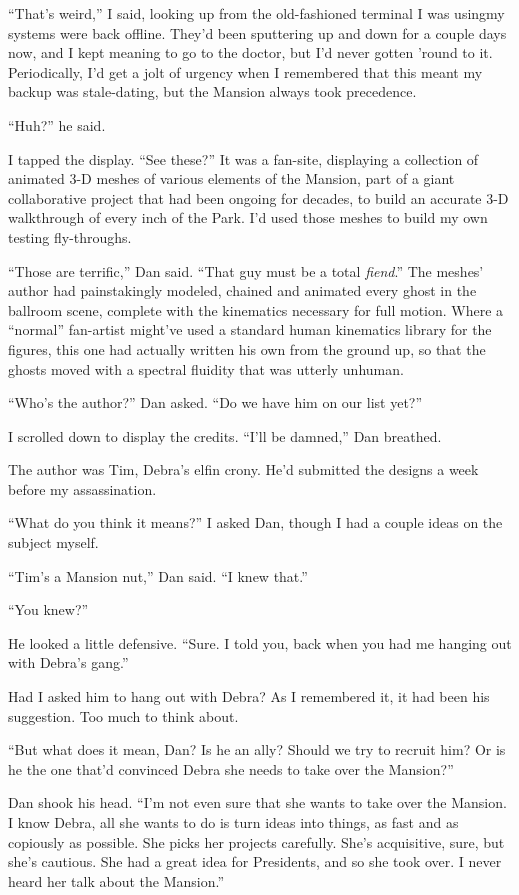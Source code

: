 “That's weird,” I said, looking up from the old-fashioned terminal
I was using{\dash}my systems were back offline. They'd been sputtering up
and down for a couple days now, and I kept meaning to go to the
doctor, but I'd never gotten 'round to it. Periodically, I'd get a
jolt of urgency when I remembered that this meant my backup was
stale-dating, but the Mansion always took precedence.

“Huh?” he said.

I tapped the display. “See these?” It was a fan-site, displaying a
collection of animated 3-D meshes of various elements of the
Mansion, part of a giant collaborative project that had been
ongoing for decades, to build an accurate 3-D walkthrough of every
inch of the Park. I'd used those meshes to build my own testing
fly-throughs.

“Those are terrific,” Dan said. “That guy must be a total
\emph{fiend}.” The meshes' author had painstakingly modeled,
chained and animated every ghost in the ballroom scene, complete
with the kinematics necessary for full motion. Where a “normal”
fan-artist might've used a standard human kinematics library for
the figures, this one had actually written his own from the ground
up, so that the ghosts moved with a spectral fluidity that was
utterly unhuman.

“Who's the author?” Dan asked. “Do we have him on our list yet?”

I scrolled down to display the credits. “I'll be damned,” Dan
breathed.

The author was Tim, Debra's elfin crony. He'd submitted the designs
a week before my assassination.

“What do you think it means?” I asked Dan, though I had a couple
ideas on the subject myself.

“Tim's a Mansion nut,” Dan said. “I knew that.”

“You knew?”

He looked a little defensive. “Sure. I told you, back when you had
me hanging out with Debra's gang.”

Had I asked him to hang out with Debra? As I remembered it, it had
been his suggestion. Too much to think about.

“But what does it mean, Dan? Is he an ally? Should we try to
recruit him? Or is he the one that'd convinced Debra she needs to
take over the Mansion?”

Dan shook his head. “I'm not even sure that she wants to take over
the Mansion. I know Debra, all she wants to do is turn ideas into
things, as fast and as copiously as possible. She picks her
projects carefully. She's acquisitive, sure, but she's cautious.
She had a great idea for Presidents, and so she took over. I never
heard her talk about the Mansion.”

